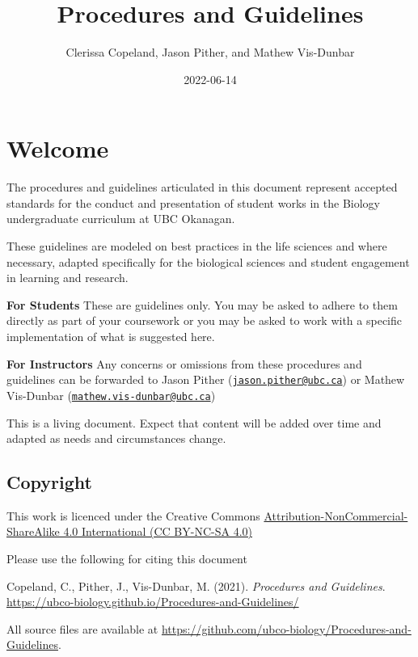 \documentclass[
]{book}
\title{Procedures and Guidelines}
\author{Clerissa Copeland, Jason Pither, and Mathew Vis-Dunbar}
\date{2022-06-14}
\begin{document}
\maketitle

{
\setcounter{tocdepth}{1}
\tableofcontents
}
\hypertarget{welcome}{%
\chapter*{Welcome}\label{welcome}}

The procedures and guidelines articulated in this document represent accepted standards for the conduct and presentation of student works in the Biology undergraduate curriculum at UBC Okanagan.

These guidelines are modeled on best practices in the life sciences and where necessary, adapted specifically for the biological sciences and student engagement in learning and research.

\textbf{For Students} These are guidelines only. You may be asked to adhere to them directly as part of your coursework or you may be asked to work with a specific implementation of what is suggested here.

\textbf{For Instructors} Any concerns or omissions from these procedures and guidelines can be forwarded to Jason Pither (\href{mailto:jason.pither@ubc.ca}{\nolinkurl{jason.pither@ubc.ca}}) or Mathew Vis-Dunbar (\href{mailto:mathew.vis-dunbar@ubc.ca}{\nolinkurl{mathew.vis-dunbar@ubc.ca}})

This is a living document. Expect that content will be added over time and adapted as needs and circumstances change.

\hypertarget{copyright}{%
\section*{Copyright}\label{copyright}}

This work is licenced under the Creative Commons \href{https://creativecommons.org/licenses/by-nc-sa/4.0/}{Attribution-NonCommercial-ShareAlike 4.0 International (CC BY-NC-SA 4.0)}

Please use the following for citing this document

Copeland, C., Pither, J., Vis-Dunbar, M. (2021). \emph{Procedures and Guidelines}. \url{https://ubco-biology.github.io/Procedures-and-Guidelines/}

All source files are available at \url{https://github.com/ubco-biology/Procedures-and-Guidelines}.
\end{document}
